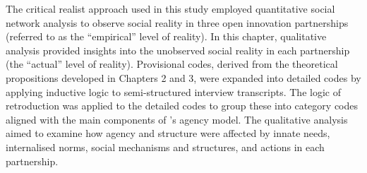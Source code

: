 The critical realist approach used in this study employed quantitative social network analysis to observe social reality in three open innovation partnerships (referred to as the \enquote{empirical} level of reality). In this chapter, qualitative analysis provided insights into the unobserved social reality in each partnership (the \enquote{actual} level of reality). Provisional codes, derived from the theoretical propositions developed in Chapters 2 and 3, were expanded into detailed codes by applying inductive logic to semi-structured interview transcripts. The logic of retroduction was applied to the detailed codes to group these into category codes aligned with the main components of \citeauthor{loyal2001agency}'s \citeyearpar{loyal2001agency}  agency model. The qualitative analysis aimed to examine how agency and structure were affected by innate needs, internalised norms, social mechanisms and structures, and actions in each partnership. \medskip

